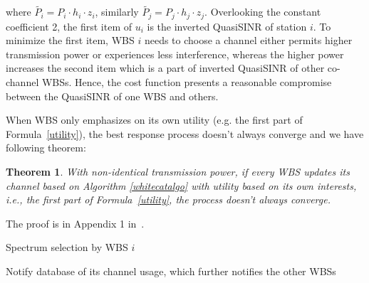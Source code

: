 \documentclass[times]{ettauth}
\newcommand{\ie}{i.e., }
\theoremstyle{mytheoremstyle}
\newtheorem{theorem}{Theorem}[section]
\theoremstyle{mytheoremstyle}
\theoremstyle{mytheoremstyle}
\begin{document}
where $\tilde{P_i} = P_i\cdot h_i\cdot z_i$, similarly $\tilde{P_j} = P_j\cdot h_j\cdot z_j$.
Overlooking the constant coefficient 2, the first item of $u_i$ is the inverted QuasiSINR of station $i$. 
To minimize the first item, WBS $i$ needs to choose a channel either permits higher transmission power or experiences less interference, whereas the higher power increases the second item which is a part of inverted QuasiSINR of other co-channel WBSs. 
Hence, the cost function presents a reasonable compromise between the QuasiSINR of one WBS and others.

When WBS only emphasizes on its own utility (e.g. the first part of Formula~\ref{utility}), the best response process doesn't always converge and we have following theorem:
\begin{theorem}
\label{noconvergence}
\emph{With non-identical transmission power, if every WBS updates its channel based on Algorithm \ref{whitecatalgo} with utility based on its own interests, \ie the first part of Formula~\ref{utility}, the process doesn't always converge.}
\end{theorem}
The proof is in Appendix 1 in~\cite{Li2012DistributedTS}.


\begin{algorithm}[h]
\caption{Spectrum selection by WBS $i$}          %
\label{whitecatalgo} 
\DontPrintSemicolon
\SetAlgoLined
{}

	
Notify database of its channel usage, which further notifies the other WBSs

\end{algorithm}

\end{document}
